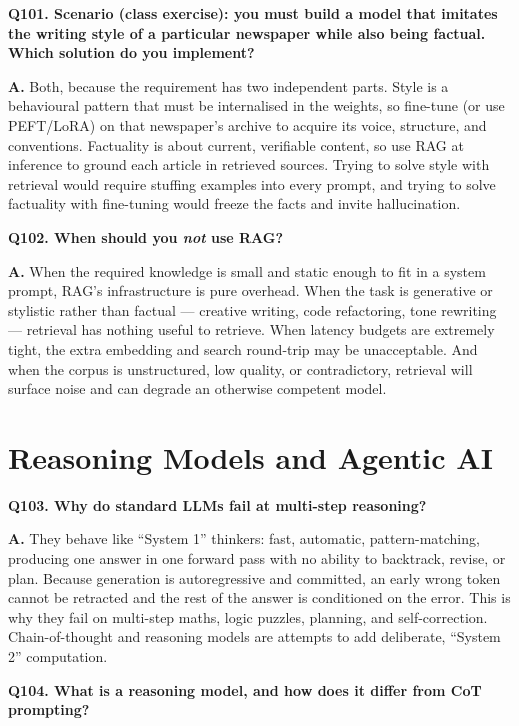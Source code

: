 \documentclass[11pt]{article}
\begin{document}
\medskip
\noindent\textbf{Q101. Scenario (class exercise): you must build a model that imitates the writing style of a particular newspaper while also being factual. Which solution do you implement?}

\noindent\textbf{A.} Both, because the requirement has two independent parts. Style is a behavioural pattern that must be internalised in the weights, so fine-tune (or use PEFT/LoRA) on that newspaper's archive to acquire its voice, structure, and conventions. Factuality is about current, verifiable content, so use RAG at inference to ground each article in retrieved sources. Trying to solve style with retrieval would require stuffing examples into every prompt, and trying to solve factuality with fine-tuning would freeze the facts and invite hallucination.

\medskip
\noindent\textbf{Q102. When should you \emph{not} use RAG?}

\noindent\textbf{A.} When the required knowledge is small and static enough to fit in a system prompt, RAG's infrastructure is pure overhead. When the task is generative or stylistic rather than factual --- creative writing, code refactoring, tone rewriting --- retrieval has nothing useful to retrieve. When latency budgets are extremely tight, the extra embedding and search round-trip may be unacceptable. And when the corpus is unstructured, low quality, or contradictory, retrieval will surface noise and can degrade an otherwise competent model.

\section{Reasoning Models and Agentic AI}

\noindent\textbf{Q103. Why do standard LLMs fail at multi-step reasoning?}

\noindent\textbf{A.} They behave like ``System 1'' thinkers: fast, automatic, pattern-matching, producing one answer in one forward pass with no ability to backtrack, revise, or plan. Because generation is autoregressive and committed, an early wrong token cannot be retracted and the rest of the answer is conditioned on the error. This is why they fail on multi-step maths, logic puzzles, planning, and self-correction. Chain-of-thought and reasoning models are attempts to add deliberate, ``System 2'' computation.

\medskip
\noindent\textbf{Q104. What is a reasoning model, and how does it differ from CoT prompting?}
\end{document}
